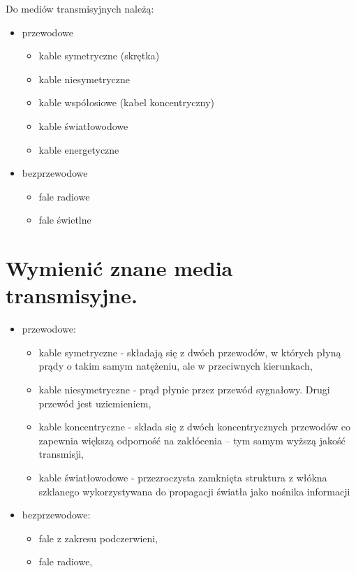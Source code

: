 \documentclass[12pt,a4paper]{article}
\begin{document}
	Do mediów transmisyjnych należą:
	\begin{itemize}
		\item przewodowe
		\begin{itemize}
			\item kable symetryczne (skrętka)
			\item kable niesymetryczne
			\item kable współosiowe (kabel koncentryczny)
			\item kable światłowodowe
			\item kable energetyczne
		\end{itemize}
		\item bezprzewodowe
		\begin{itemize}
			\item fale radiowe
			\item fale świetlne
		\end{itemize}
	\end{itemize}

	\section{Wymienić znane media transmisyjne.}
	\begin{itemize}
		\item przewodowe:
		\begin{itemize}
			\item kable symetryczne - składają się z dwóch przewodów, w których płyną prądy o takim samym natężeniu, ale w przeciwnych kierunkach,
			\item kable niesymetryczne - prąd płynie przez przewód sygnałowy. Drugi przewód jest uziemieniem,
			\item kable koncentryczne - składa się z dwóch koncentrycznych przewodów co zapewnia większą odporność na zakłócenia – tym samym wyższą jakość transmisji,
			\item kable światłowodowe - przezroczysta zamknięta struktura z włókna szklanego wykorzystywana do propagacji światła jako nośnika informacji
		\end{itemize}
		\item bezprzewodowe:
		\begin{itemize}
			\item fale z zakresu podczerwieni,
			\item fale radiowe,
		\end{itemize}
	\end{itemize}
\end{document}
